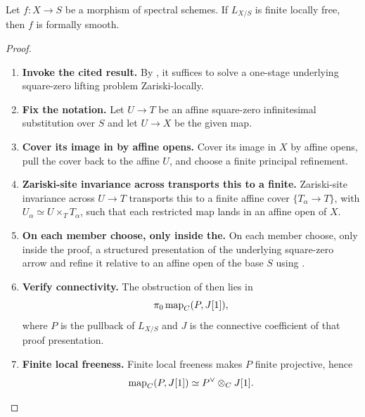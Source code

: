 \begin{proposition}
\label{prop:finite-locally-free-formal-smooth}
Let \(f:X\to S\) be a morphism of spectral schemes. If \(L_{X/S}\) is
finite locally free, then \(f\) is formally smooth.
\end{proposition}

\begin{proof}
\leavevmode
\begin{enumerate}[label=\textup{(\arabic*)}]
    \item \textbf{Invoke the cited result.}
    By , it suffices to solve a one-stage
    underlying square-zero lifting problem Zariski-locally.

    \item \textbf{Fix the notation.}
    Let \(U\to T\) be an affine square-zero infinitesimal substitution over \(S\) and let
    \(U\to X\) be the given map.

    \item \textbf{Cover its image in by affine opens.}
    Cover its image in \(X\) by affine opens, pull the cover back to the affine
    \(U\), and choose a finite principal refinement.

    \item \textbf{Zariski-site invariance across transports this to a finite.}
    Zariski-site invariance across \(U\to T\) transports this to a finite affine cover
    \(\{T_\alpha\to T\}\), with \(U_\alpha\simeq U\times_TT_\alpha\), such that each restricted map lands in an affine open of
    \(X\).

    \item \textbf{On each member choose, only inside the.}
    On each member choose, only inside the proof, a structured presentation of the underlying
    square-zero arrow and refine it relative to an affine open of the base \(S\) using
    .

    \item \textbf{Verify connectivity.}
    The obstruction of  then lies in
    \[
        \pi_0\operatorname{map}_C(P,J[1]),
    \]
    where \(P\) is the pullback of \(L_{X/S}\) and \(J\) is the connective
    coefficient of that proof presentation.

    \item \textbf{Finite local freeness.}
    Finite local freeness makes \(P\) finite projective, hence
    \[
        \operatorname{map}_C(P,J[1])
        \simeq
        P^\vee\otimes_CJ[1].
    \]


\end{enumerate}
\end{proof}
